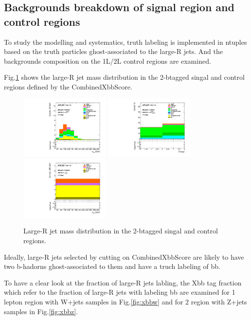 \subsection{Backgrounds breakdown of signal region and control regions}

\par To study the modelling and systematics, truth labeling is implemented in ntuples based on the truth particles ghost-associated to the large-R jets.
And the backgrounds composition on the 1L/2L control regions are examined.
\par Fig.\ref{fig:fl_mj} shows the large-R jet mass distribution in the 2-btagged singal and control regions defined by the CombinedXbbScore.
\begin{figure}[h]
    \centering
    \includegraphics[width=0.4\textwidth]{appendices/fig/Region_BMin500_incFat1_Fat1_incJet1_Y2015_DSR_T2_L0_distmBB_J0_Prefit.pdf}
    \includegraphics[width=0.4\textwidth]{appendices/fig/Region_BMin500_incFat1_Fat1_incJet1_Y2015_DCR1_T2_L1_distCharge_J0_Prefit.pdf}
    \includegraphics[width=0.4\textwidth]{appendices/fig/Region_BMin500_incFat1_Fat1_incJet1_Y2015_DCR2_T2_L2_distmBB_J0_Prefit.pdf}

    \caption{Large-R jet mass distribution in the 2-btagged singal and control regions.}
    \label{fig:fl_mj}
\end{figure}
\par Ideally, large-R jets selected by cutting on CombinedXbbScore are likely to have two b-hadorns ghost-associated to them and have a truch labeling of bb.
\par To have a clear look at the fraction of large-R jets labling, the Xbb tag fraction which refer to the fraction of large-R jets with labeling bb are examined for 1 lepton region with W+jets samples in Fig.\ref{fig:xbbw} and for 2 region with Z+jets samples in Fig.\ref{fig:xbbz}.

